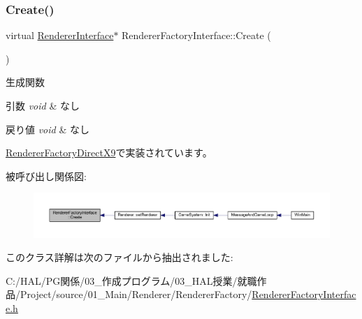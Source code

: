 \subsubsection{\texorpdfstring{Create()}{Create()}}
{\footnotesize\ttfamily virtual \mbox{\hyperlink{class_renderer_interface}{Renderer\+Interface}}$\ast$ Renderer\+Factory\+Interface\+::\+Create (\begin{DoxyParamCaption}{ }\end{DoxyParamCaption})\hspace{0.3cm}{\ttfamily [pure virtual]}}



生成関数 


\begin{DoxyParams}{引数}
{\em void} & なし \\
\hline
\end{DoxyParams}

\begin{DoxyRetVals}{戻り値}
{\em void} & なし \\
\hline
\end{DoxyRetVals}


\mbox{\hyperlink{class_renderer_factory_direct_x9_aa64ac54f3efe121f531a28dd3b7690e3}{Renderer\+Factory\+Direct\+X9}}で実装されています。

被呼び出し関係図\+:
\nopagebreak
\begin{figure}[H]
\begin{center}
\leavevmode
\includegraphics[width=350pt]{class_renderer_factory_interface_aa81911973b6079fda8489409385d71e3_icgraph}
\end{center}
\end{figure}


このクラス詳解は次のファイルから抽出されました\+:\begin{DoxyCompactItemize}
\item 
C\+:/\+H\+A\+L/\+P\+G関係/03\+\_\+作成プログラム/03\+\_\+\+H\+A\+L授業/就職作品/\+Project/source/01\+\_\+\+Main/\+Renderer/\+Renderer\+Factory/\mbox{\hyperlink{_renderer_factory_interface_8h}{Renderer\+Factory\+Interface.\+h}}\end{DoxyCompactItemize}
